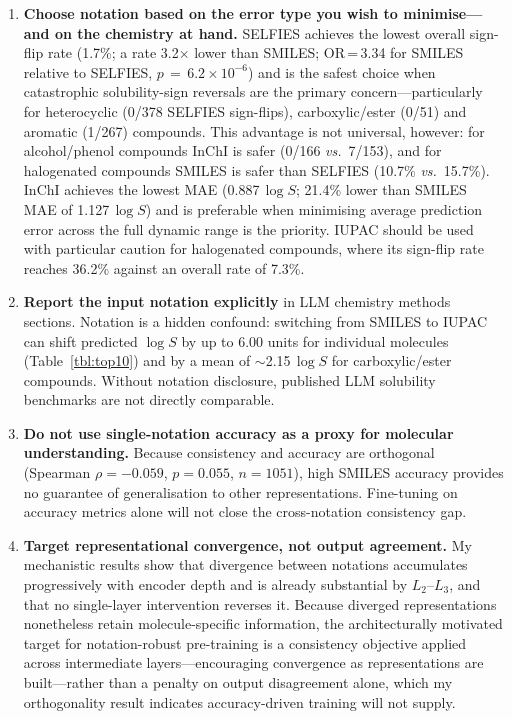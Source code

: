 \documentclass[twoside,twocolumn,9pt]{article}
\newcommand{\logS}{\ensuremath{\log S}}
\begin{document}
\begin{enumerate}
\item \textbf{Choose notation based on the error type you wish to minimise---and on the chemistry at hand.} SELFIES achieves the lowest overall sign-flip rate (1.7\%; a rate 3.2$\times$ lower than SMILES; OR\,=\,3.34 for SMILES relative to SELFIES, $p\,=\,6.2\!\times\!10^{-6}$) and is the safest choice when catastrophic solubility-sign reversals are the primary concern---particularly for heterocyclic (0/378 SELFIES sign-flips), carboxylic/ester (0/51) and aromatic (1/267) compounds. This advantage is not universal, however: for alcohol/phenol compounds InChI is safer (0/166 \textit{vs.}\ 7/153), and for halogenated compounds SMILES is safer than SELFIES (10.7\% \textit{vs.}\ 15.7\%). InChI achieves the lowest MAE (0.887\,$\logS$; 21.4\% lower than SMILES MAE of 1.127\,$\logS$) and is preferable when minimising average prediction error across the full dynamic range is the priority. IUPAC should be used with particular caution for halogenated compounds, where its sign-flip rate reaches 36.2\% against an overall rate of 7.3\%.
\item \textbf{Report the input notation explicitly} in LLM chemistry methods sections. Notation is a hidden confound: switching from SMILES to IUPAC can shift predicted $\logS$ by up to 6.00 units for individual molecules (Table~\ref{tbl:top10}) and by a mean of $\sim$2.15\,$\logS$ for carboxylic/ester compounds. Without notation disclosure, published LLM solubility benchmarks are not directly comparable.
\item \textbf{Do not use single-notation accuracy as a proxy for molecular understanding.} Because consistency and accuracy are orthogonal (Spearman $\rho=-0.059$, $p=0.055$, $n=1051$), high SMILES accuracy provides no guarantee of generalisation to other representations. Fine-tuning on accuracy metrics alone will not close the cross-notation consistency gap.
\item \textbf{Target representational convergence, not output agreement.} My mechanistic results show that divergence between notations accumulates progressively with encoder depth and is already substantial by $L_2$--$L_3$, and that no single-layer intervention reverses it. Because diverged representations nonetheless retain molecule-specific information, the architecturally motivated target for notation-robust pre-training is a consistency objective applied across intermediate layers---encouraging convergence as representations are built---rather than a penalty on output disagreement alone, which my orthogonality result indicates accuracy-driven training will not supply.
\end{enumerate}
\end{document}
